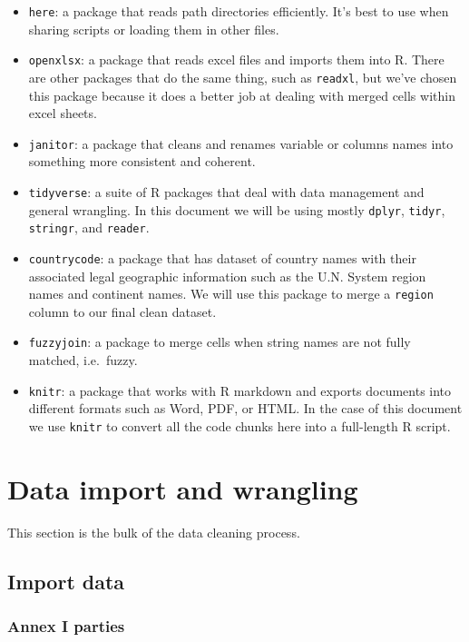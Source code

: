 \documentclass[
  12pt,
]{article}
\begin{document}
\begin{itemize}
\item
  \texttt{here}: a package that reads path directories efficiently. It's
  best to use when sharing scripts or loading them in other files.
\item
  \texttt{openxlsx}: a package that reads excel files and imports them
  into R. There are other packages that do the same thing, such as
  \texttt{readxl}, but we've chosen this package because it does a
  better job at dealing with merged cells within excel sheets.
\item
  \texttt{janitor}: a package that cleans and renames variable or
  columns names into something more consistent and coherent.
\item
  \texttt{tidyverse}: a suite of R packages that deal with data
  management and general wrangling. In this document we will be using
  mostly \texttt{dplyr}, \texttt{tidyr}, \texttt{stringr}, and
  \texttt{reader}.
\item
  \texttt{countrycode}: a package that has dataset of country names with
  their associated legal geographic information such as the U.N. System
  region names and continent names. We will use this package to merge a
  \texttt{region} column to our final clean dataset.
\item
  \texttt{fuzzyjoin}: a package to merge cells when string names are not
  fully matched, i.e.~fuzzy.
\item
  \texttt{knitr}: a package that works with R markdown and exports
  documents into different formats such as Word, PDF, or HTML. In the
  case of this document we use \texttt{knitr} to convert all the code
  chunks here into a full-length R script.
\end{itemize}

\hypertarget{data-import-and-wrangling}{%
\section{Data import and wrangling}\label{data-import-and-wrangling}}

This section is the bulk of the data cleaning process.

\hypertarget{import-data}{%
\subsection{Import data}\label{import-data}}

\hypertarget{annex-i-parties}{%
\subsubsection{Annex I parties}\label{annex-i-parties}}
\end{document}

